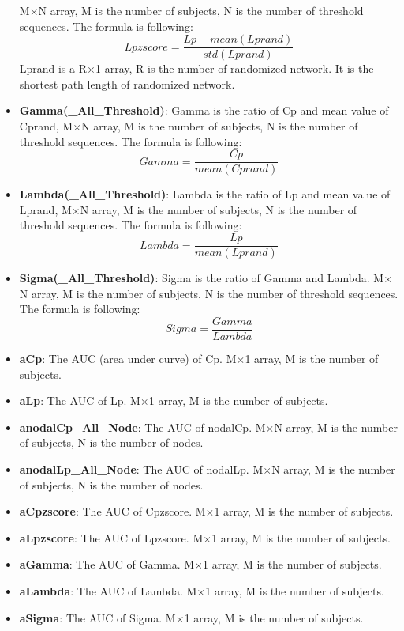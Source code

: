 \documentclass[11pt]{article}
\begin{document}
\begin{itemize}
						M$\times$N array, M is the number of subjects, N is the number of threshold sequences.
						The formula is following:
						$$Lpzscore=\frac{Lp-mean(Lprand)}{std(Lprand)}$$
						Lprand is a R$\times$1 array, R is the number of randomized network. 
						It is the shortest path length of randomized network.
					\item \textbf{Gamma(\_All\_Threshold)}: Gamma is the ratio of Cp and mean value of Cprand,
						M$\times$N array, M is the number of subjects, N is the number of threshold sequences.
						The formula is following:
						$$Gamma=\frac{Cp}{mean(Cprand)}$$
					\item \textbf{Lambda(\_All\_Threshold)}: Lambda is the ratio of Lp and mean value of Lprand,
						M$\times$N array, M is the number of subjects, N is the number of threshold sequences.
						The formula is following:
						$$Lambda=\frac{Lp}{mean(Lprand)}$$
					\item \textbf{Sigma(\_All\_Threshold)}: Sigma is the ratio of Gamma and Lambda.
						M$\times$N array, M is the number of subjects, N is the number of threshold sequences.
						The formula is following:
						$$Sigma=\frac{Gamma}{Lambda}$$
					\item \textbf{aCp}: The AUC (area under curve) of Cp.
						M$\times$1 array, M is the number of subjects.
					\item \textbf{aLp}: The AUC of Lp.
						M$\times$1 array, M is the number of subjects.
					\item \textbf{anodalCp\_All\_Node}: The AUC of nodalCp.
						M$\times$N array, M is the number of subjects, N is the number of nodes.
					\item \textbf{anodalLp\_All\_Node}: The AUC of nodalLp.
						M$\times$N array, M is the number of subjects, N is the number of nodes.
					\item \textbf{aCpzscore}: The AUC of Cpzscore.
						M$\times$1 array, M is the number of subjects.
					\item \textbf{aLpzscore}: The AUC of Lpzscore.
						M$\times$1 array, M is the number of subjects.
					\item \textbf{aGamma}: The AUC of Gamma.
						M$\times$1 array, M is the number of subjects.
					\item \textbf{aLambda}: The AUC of Lambda.
						M$\times$1 array, M is the number of subjects.
					\item \textbf{aSigma}: The AUC of Sigma.
						M$\times$1 array, M is the number of subjects.
				\end{itemize}
\end{document}
